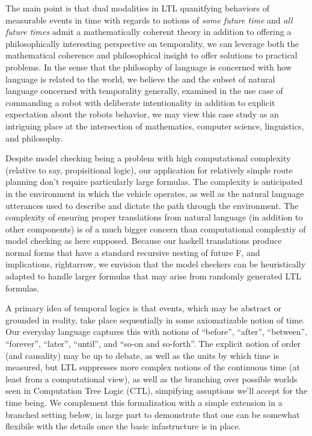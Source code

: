 \documentclass{article}
\begin{document}
The main point is that dual modalities in LTL quanitfying behaviors of
measurable events in time with regards to notions of \emph{some future time} and
\emph{all future times} admit a mathematically coherent theory in addition to
offering a philosophically interesting perspective on temporality, we can
leverage both the mathematical coherence and philosophical insight to offer
solutions to practical problems. In the sense that the philosophy of language is
concerned with how language is related to the world, we believe the and the
subset of natural language concerned with temporality generally, examined in the
use case of commanding a robot with deliberate intentionality in addition to
explicit expectation about the robots behavior, we may view this case study as an
intriguing place at the intersection of mathematics, computer science,
linguistics, and philosophy.

Despite model checking being a problem with high computational complexity
(relative to say, propisitional logic), our application for relatively simple
route planning don't require particularly large formulas. The complexity is
anticipated in the environment in which the vehicle operates, as well as the
natural language utterances used to describe and dictate the path through the
environment. The complexity of ensuring proper translations from natural
language (in addition to other components) is of a much bigger concern than
computational complextiy of model checking as here supposed. Because our haskell
translations produce normal forms that have a standard recursive nesting of
future F, and implications, rightarrow, we envision that the model checkers can
be heuristically adapted to handle larger formulas that may arise from randomly
generated LTL formulas.

A primary idea of temporal logics is that events, which may be abstract or
grounded in reality, take place sequentially in some axiomatizable notion of
time. Our everyday language captures this with notions of ``before'', ``after'',
``between'', ``forever'', ``later'', ``until'', and ``so-on and so-forth''. The
explicit notion of order (and causality) may be up to debate, as well as the
units by which time is measured, but LTL suppresses more complex notions of the
continuous time (at least from a computational view), as well as the branching
over possible worlds seen in Computation Tree Logic (CTL), simpifying assuptions
we'll accept for the time being. We complement this formalization with a simple
extension in a branched setting below, in large part to demonstrate that one can
be somewhat flexibile with the details once the basic infastructure is in place.
\end{document}
